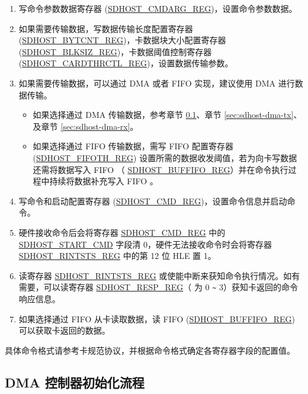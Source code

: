 \documentclass[main\_\_CN.tex]{subfiles}
\begin{document}
\begin{enumerate}
\item 写命令参数数据寄存器 (\hyperref[fielddesc:SDHOSTCMDARGREG]{\hyperref[regdesc:SDHOSTCMDARGREG]{SDHOST\_CMDARG\_REG}})，设置命令参数数据。
\item 如果需要传输数据，写数据传输长度配置寄存器 (\hyperref[regdesc:SDHOSTBYTCNTREG]{SDHOST\_BYTCNT\_REG})，卡数据块大小配置寄存器 (\hyperref[regdesc:SDHOSTBLKSIZREG]{SDHOST\_BLKSIZ\_REG})，卡数据阈值控制寄存器 (\hyperref[regdesc:SDHOSTCARDTHRCTLREG]{SDHOST\_CARDTHRCTL\_REG})，设置数据传输参数。
\item 如果需要传输数据，可以通过 DMA 或者 FIFO 实现，建议使用 DMA 进行数据传输。
\begin{itemize}
    \item 如果选择通过 DMA 传输数据，参考章节 \ref{sec:sdhost-dma-init}、章节 \ref{sec:sdhost-dma-tx}、及章节 \ref{sec:sdhost-dma-rx}。
    \item 如果选择通过 FIFO 传输数据，需写 FIFO 配置寄存器 (\hyperref[regdesc:SDHOSTFIFOTHREG]{SDHOST\_FIFOTH\_REG}) 设置所需的数据收发阈值，若为向卡写数据还需将数据写入 FIFO （ \hyperref[fielddesc:SDHOSTBUFFIFOREG]{\hyperref[regdesc:SDHOSTBUFFIFOREG]{SDHOST\_BUFFIFO\_REG}}）并在命令执行过程中持续将数据补充写入 FIFO 。
\end{itemize}
\item 写命令和启动配置寄存器 (\hyperref[regdesc:SDHOSTCMDREG]{SDHOST\_CMD\_REG})，设置命令信息并启动命令。
\item 硬件接收命令后会将寄存器 \hyperref[regdesc:SDHOSTCMDREG]{SDHOST\_CMD\_REG} 中的 \hyperref[fielddesc:SDHOSTSTARTCMD]{SDHOST\_START\_CMD} 字段清 0，硬件无法接收命令时会将寄存器 \hyperref[regdesc:SDHOSTRINTSTSREG]{SDHOST\_RINTSTS\_REG} 中的第 12 位 HLE 置 1。
\item 读寄存器 \hyperref[regdesc:SDHOSTRINTSTSREG]{SDHOST\_RINTSTS\_REG} 或使能中断来获知命令执行情况。如有需要，可以读寄存器 \hyperref[regdesc:SDHOSTRESP0REG]{SDHOST\_RESP\_REG}（ 为 0 \verb+~+ 3）获知卡返回的命令响应信息。
\item 如果选择通过 FIFO 从卡读取数据，读 FIFO (\hyperref[fielddesc:SDHOSTBUFFIFOREG]{\hyperref[regdesc:SDHOSTBUFFIFOREG]{SDHOST\_BUFFIFO\_REG}}) 可以获取卡返回的数据。
\end{enumerate}

具体命令格式请参考卡规范协议，并根据命令格式确定各寄存器字段的配置值。

\subsection{DMA 控制器初始化流程}\label{sec:sdhost-dma-init}
\end{document}
